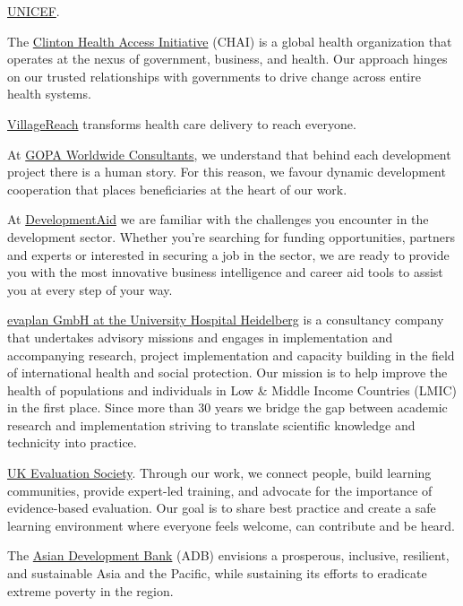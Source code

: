 \documentclass[
  letterpaper,
  DIV=11,
  numbers=noendperiod]{scrreprt}
\begin{document}
\href{https://jobs.unicef.org/en-us/listing/?jobnotfound=true}{UNICEF}.

The
\href{https://www.clintonhealthaccess.org/about-us/\#history}{Clinton
Health Access Initiative} (CHAI) is a global health organization that
operates at the nexus of government, business, and health. Our approach
hinges on our trusted relationships with governments to drive change
across entire health systems.

\href{https://www.villagereach.org/}{VillageReach} transforms health
care delivery to reach everyone.

At \href{https://www.gopa.de/\#jump-list-target-191-0}{GOPA Worldwide
Consultants}, we understand that behind each development project there
is a human story. For this reason, we favour dynamic development
cooperation that places beneficiaries at the heart of our work.

At \href{https://www.developmentaid.org/}{DevelopmentAid} we are
familiar with the challenges you encounter in the development sector.
Whether you're searching for funding opportunities, partners and experts
or interested in securing a job in the sector, we are ready to provide
you with the most innovative business intelligence and career aid tools
to assist you at every step of your way.

\href{https://www.evaplan.org/}{evaplan GmbH at the University Hospital
Heidelberg} is a consultancy company that undertakes advisory missions
and engages in implementation and accompanying research, project
implementation and capacity building in the field of international
health and social protection. Our mission is to help improve the health
of populations and individuals in Low \& Middle Income Countries (LMIC)
in the first place. Since more than 30 years we bridge the gap between
academic research and implementation striving to translate scientific
knowledge and technicity into practice.

\href{https://evaluation.org.uk/about-us/}{UK Evaluation Society}.
Through our work, we connect people, build learning communities, provide
expert-led training, and advocate for the importance of evidence-based
evaluation. Our goal is to share best practice and create a safe
learning environment where everyone feels welcome, can contribute and be
heard.

The \href{https://www.adb.org/who-we-are}{Asian Development Bank} (ADB)
envisions a prosperous, inclusive, resilient, and sustainable Asia and
the Pacific, while sustaining its efforts to eradicate extreme poverty
in the region.
\end{document}
